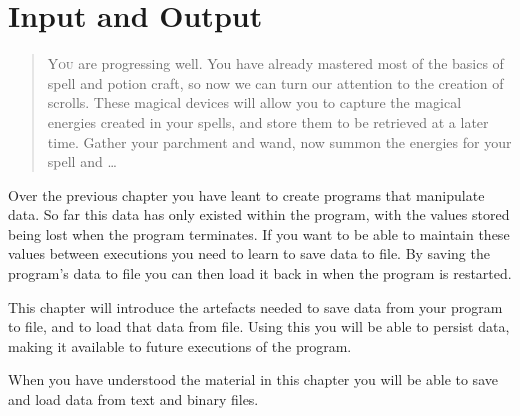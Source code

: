 \chapter{Input and Output} %
\label{cha:input_and_output}

\begin{quote}
  \Fontlukas\Large
  \renewcommand{\LettrineTextFont}{\relax}
  \lettrine[image=true,lines=3,lraise=0.1]
  {Y}{ou} are progressing well. You have already mastered most of the basics of spell and potion craft, so now we can turn our attention to the creation of scrolls. These magical devices will allow you to capture the magical energies created in your spells, and store them to be retrieved at a later time. Gather your parchment and wand, now summon the energies for your spell and \ldots
\end{quote}

\bigskip

Over the previous chapter you have leant to create programs that manipulate data. So far this data has only existed within the program, with the values stored being lost when the program terminates. If you want to be able to maintain these values between executions you need to learn to save data to file. By saving the program's data to file you can then load it back in when the program is restarted.

This chapter will introduce the artefacts needed to save data from your program to file, and to load that data from file. Using this you will be able to persist data, making it available to future executions of the program.

When you have understood the material in this chapter you will be able to save and load data from text and binary files. 

\clearpage

\minitoc








% 

\clearpage
\def\pageLang{none}
% 
% 
% 
% 



